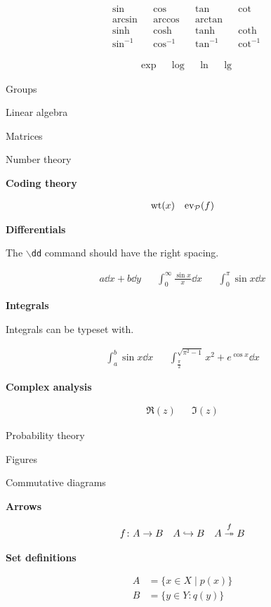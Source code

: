 \documentclass{myassignment}
\begin{document}
\begin{align*}
    &\sin & &\cos & &\tan & &\cot \\
    &\arcsin & &\arccos & &\arctan \\
    &\sinh & &\cosh && \tanh & &\coth \\
    &\sin^{-1} & &\cos^{-1} & &\tan^{-1} & &\cot^{-1}
\end{align*}

\begin{align*}
    &\exp & &\log & &\ln & &\lg
\end{align*}

Groups

Linear algebra

Matrices

Number theory

\textbf{Coding theory}

\begin{align*}
    \operatorname{wt}(x) && \operatorname{ev}_\mathcal{P}(f)
\end{align*}

\textbf{Differentials}

The \texttt{$\backslash$dd} command should have the right spacing.

\begin{align*}
    a\dd x + b\dd y && \int_0^\infty \frac{\sin x}{x} \dd x && \int_0^\pi \sin x \dd x
\end{align*}

\textbf{Integrals}

Integrals can be typeset with.

\begin{align*}
    \int_a^b \sin x \dd x && \int_{\frac{\pi}{2}}^{\sqrt{\pi^2 - 1}} x^2 + e^{\cos x} \dd x
\end{align*}

\textbf{Complex analysis}

\begin{align*}
    \Re(z) && \Im(z)
\end{align*}

Probability theory

Figures

Commutative diagrams

\textbf{Arrows}

\begin{align*}
    f \colon A \to B && A \hookrightarrow B && A \stackrel{f}{\twoheadrightarrow} B
\end{align*}

\textbf{Set definitions}

\begin{align*}
    A &= \{ x \in X \mid p(x) \} \\
    B &= \{ y \in Y \colon q(y) \}
\end{align*}
\end{document}
